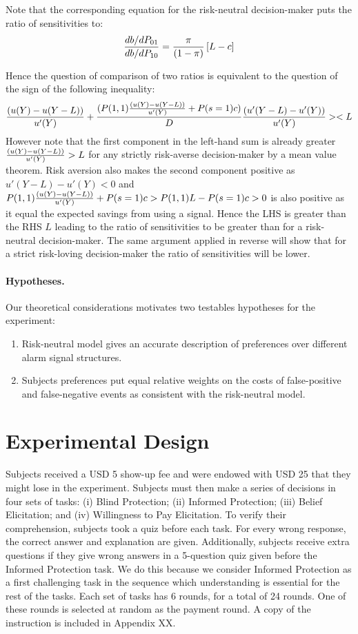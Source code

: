 \documentclass[12pt,a4paper]{article}
\begin{document}
Note that the corresponding equation for the risk-neutral decision-maker puts the ratio of sensitivities to:
\[{db/dP_{01} \over db/dP_{10}}= {\pi \over (1-\pi)} \left[L-c \right] \]

Hence the question of comparison of two ratios is equivalent to the question of the sign of the following inequality:
\[{(u(Y)-u(Y-L)) \over u'(Y)}+{(P(1,1){(u(Y)-u(Y-L)) \over u'(Y)}+P(s=1)c) \over D}{(u'(Y-L)-u'(Y))\over u'(Y)}><L\]
However note that the first component in the left-hand sum is already greater ${(u(Y)-u(Y-L)) \over u'(Y)}>L$ for any strictly risk-averse decision-maker by a mean value theorem. Risk aversion also makes the second component positive as  $u'(Y-L)-u'(Y)<0$ and $P(1,1){(u(Y)-u(Y-L)) \over u'(Y)}+P(s=1)c>P(1,1)L-P(s=1)c>0$ is also positive as it equal the expected savings from using a signal. Hence the LHS is greater than the RHS $L$ leading to the ratio of sensitivities to be greater than for a risk-neutral decision-maker. The same argument applied in reverse will show that for a strict risk-loving decision-maker the ratio of sensitivities will be lower. \normalsize


\vspace{10pt}
\paragraph{Hypotheses.} Our theoretical considerations motivates two testables hypotheses for the experiment:
\begin{enumerate}
\item Risk-neutral model gives an accurate description of preferences over different alarm signal structures.
\item Subjects preferences put equal relative weights on the costs of false-positive and false-negative events as consistent with the risk-neutral model. 
\end{enumerate}




\vspace{20pt}

\section{Experimental Design}

Subjects received a USD 5 show-up fee and were endowed with USD 25 that they might lose in the experiment. Subjects must then make a series of decisions in four sets of tasks: (i) Blind Protection; (ii) Informed Protection; (iii) Belief Elicitation; and (iv) Willingness to Pay Elicitation. To verify their comprehension, subjects took a quiz before each task. For every wrong response, the correct answer and explanation are given. Additionally, subjects receive extra questions if they give wrong answers in a 5-question quiz given before the Informed Protection task. We do this because we consider Informed Protection as a first challenging task in the sequence which understanding is essential for the rest of the tasks. 
Each set of tasks has 6 rounds, for a total of 24 rounds. One of these rounds is selected at random as the payment round. A copy of the instruction is included in Appendix XX.
\end{document}
